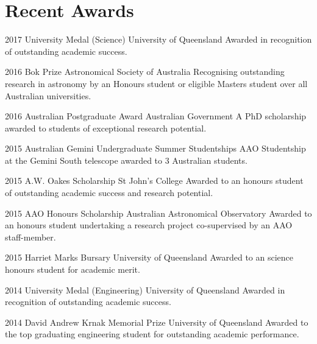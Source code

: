 \documentclass[]{friggeri-cv} %
\begin{document}
\section{Recent Awards}
\begin{entrylist}
\entry
{2017}
{University Medal (Science)}
{University of Queensland}
{Awarded in recognition of outstanding academic success.}
\end{entrylist}
\begin{entrylist}
	\entry
{2016}
{Bok Prize}
{Astronomical Society of Australia}
{Recognising outstanding research in astronomy by an Honours student or eligible Masters student over all Australian universities.}
\end{entrylist}
\begin{entrylist}
	\entry
{2016}
{Australian Postgraduate Award}
{Australian Government}
{A PhD scholarship awarded to students of exceptional research potential.}
\end{entrylist}
\begin{entrylist}
	\entry
{2015}
{Australian Gemini Undergraduate Summer Studentships}
{AAO}
{Studentship at the Gemini South telescope awarded to 3 Australian students.}
\end{entrylist}
\begin{entrylist}
\entry
{2015}
{A.W. Oakes Scholarship}
{St John's College}
{Awarded to an honours student of outstanding academic success and research potential.}
\end{entrylist}
\begin{entrylist}
\entry
{2015}
{AAO Honours Scholarship}
{Australian Astronomical Observatory}
{Awarded to an honours student undertaking a research project co-supervised by an AAO staff-member.}
\end{entrylist}
\begin{entrylist}
\entry
{2015}
{Harriet Marks Bursary}
{University of Queensland}
{Awarded to an science honours student for academic merit.}
\end{entrylist}
\begin{entrylist}
\entry
{2014}
{University Medal (Engineering)}
{University of Queensland}
{Awarded in recognition of outstanding academic success.}
\end{entrylist}
\begin{entrylist}
\entry
{2014}
{David Andrew Krnak Memorial Prize}
{University of Queensland}
{Awarded to the top graduating engineering student for outstanding academic performance.}
\end{entrylist}
\end{document}
